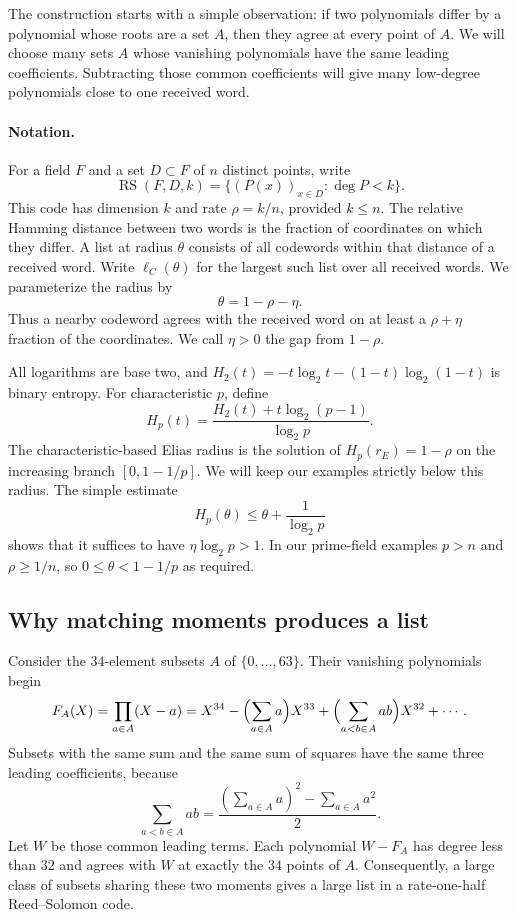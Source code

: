 \documentclass[11pt,letterpaper]{article}
\theoremstyle{definition}
\theoremstyle{remark}
\newcommand{\RS}{\operatorname{RS}}
\begin{document}
The construction starts with a simple observation: if two polynomials differ
by a polynomial whose roots are a set $A$, then they agree at every point of
$A$. We will choose many sets $A$ whose vanishing polynomials have the same
leading coefficients. Subtracting those common coefficients will give many
low-degree polynomials close to one received word.

\paragraph{Notation.}
For a field $F$ and a set $D\subset F$ of $n$ distinct points, write
\[
 \RS(F,D,k)=\{(P(x))_{x\in D}:\deg P<k\}.
\]
This code has dimension $k$ and rate $\rho=k/n$, provided $k\le n$.
The relative Hamming distance between two words is the fraction of coordinates
on which they differ. A list at radius $\theta$ consists of all codewords
within that distance of a received word. Write $\ell_C(\theta)$ for the largest
such list over all received words. We parameterize the radius by
\[
 \theta=1-\rho-\eta.
\]
Thus a nearby codeword agrees with the received word on at least a
$\rho+\eta$ fraction of the coordinates. We call $\eta>0$ the gap from
$1-\rho$.

All logarithms are base two, and
$H_2(t)=-t\log_2t-(1-t)\log_2(1-t)$ is binary entropy. For characteristic $p$,
define
\[
 H_p(t)=\frac{H_2(t)+t\log_2(p-1)}{\log_2p}.
\]
The characteristic-based Elias radius is the solution of
$H_p(r_E)=1-\rho$ on the increasing branch $[0,1-1/p]$.
We will keep our examples strictly below this radius. The simple estimate
\begin{equation}\label{im:entropy}
 H_p(\theta)\le\theta+\frac1{\log_2p}
\end{equation}
shows that it suffices to have $\eta\log_2p>1$.
In our prime-field examples $p>n$ and $\rho\ge1/n$, so
$0\le\theta<1-1/p$ as required.

\subsection{Why matching moments produces a list}

Consider the $34$-element subsets $A$ of $\{0,\ldots,63\}$. Their vanishing
polynomials begin
\[
 F_A(X)=\prod_{a\in A}(X-a)
 =X^{34}-\Bigl(\sum_{a\in A}a\Bigr)X^{33}
   +\Bigl(\sum_{a<b\in A}ab\Bigr)X^{32}+\cdots.
\]
Subsets with the same sum and the same sum of squares have the same three
leading coefficients, because
\[
 \sum_{a<b\in A}ab
 =\frac{(\sum_{a\in A}a)^2-\sum_{a\in A}a^2}{2}.
\]
Let $W$ be those common leading terms. Each polynomial $W-F_A$ has degree
less than $32$ and agrees with $W$ at exactly the $34$ points of $A$.
Consequently, a large class of subsets sharing these two moments gives a
large list in a rate-one-half Reed--Solomon code.
\end{document}

